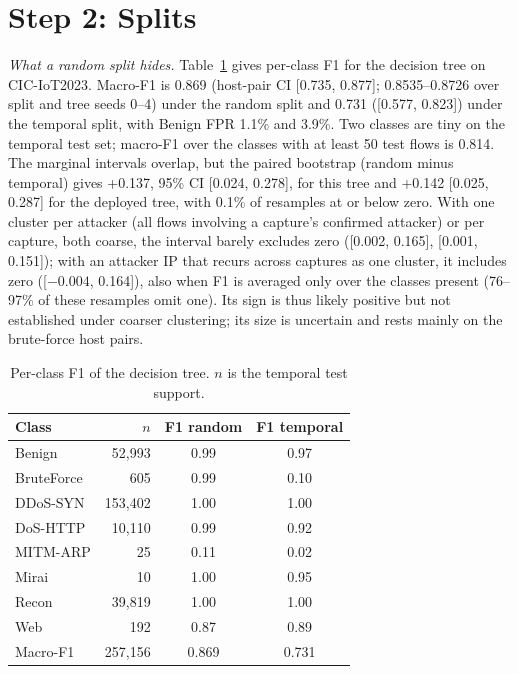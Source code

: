 \section{Step 2: Splits}\label{sec:splits}

\emph{What a random split hides.} Table~\ref{tab:perclass} gives per-class F1 for the decision tree on CIC-IoT2023. Macro-F1 is 0.869 (host-pair CI [0.735, 0.877]; 0.8535--0.8726 over split and tree seeds 0--4) under the random split and 0.731 ([0.577, 0.823]) under the temporal split, with Benign FPR 1.1\% and 3.9\%. Two classes are tiny on the temporal test set; macro-F1 over the classes with at least 50 test flows is 0.814. The marginal intervals overlap, but the paired bootstrap (random minus temporal) gives +0.137, 95\% CI [0.024, 0.278], for this tree and +0.142 [0.025, 0.287] for the deployed tree, with 0.1\% of resamples at or below zero. With one cluster per attacker (all flows involving a capture's confirmed attacker) or per capture, both coarse, the interval barely excludes zero ([0.002, 0.165], [0.001, 0.151]); with an attacker IP that recurs across captures as one cluster, it includes zero ([$-0.004$, 0.164]), also when F1 is averaged only over the classes present (76--97\% of these resamples omit one). Its sign is thus likely positive but not established under coarser clustering; its size is uncertain and rests mainly on the brute-force host pairs.

\begin{table}[t]
\centering
\caption{Per-class F1 of the decision tree. $n$ is the temporal test support.}
\label{tab:perclass}
\footnotesize
\begin{tabular}{lrcc}
\hline
Class & $n$ & F1 random & F1 temporal \\
\hline
Benign     &  52,993 & 0.99 & 0.97 \\
BruteForce &     605 & 0.99 & 0.10 \\
DDoS-SYN   & 153,402 & 1.00 & 1.00 \\
DoS-HTTP   &  10,110 & 0.99 & 0.92 \\
MITM-ARP   &      25 & 0.11 & 0.02 \\
Mirai      &      10 & 1.00 & 0.95 \\
Recon      &  39,819 & 1.00 & 1.00 \\
Web        &     192 & 0.87 & 0.89 \\
\hline
Macro-F1   & 257,156 & 0.869 & 0.731 \\
\hline
\end{tabular}
\end{table}

